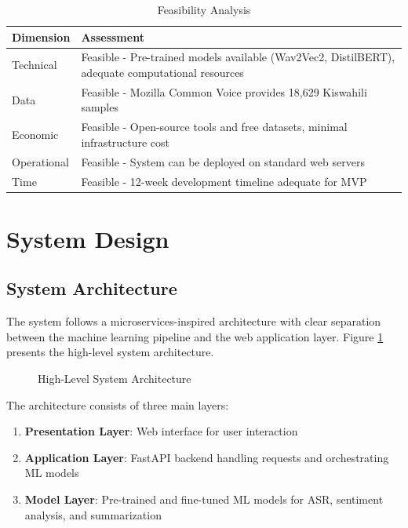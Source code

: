 \documentclass[12pt,a4paper]{report}
\begin{document}
\begin{table}[H]
\centering
\caption{Feasibility Analysis}
\label{tab:feasibility}
\begin{tabular}{@{}lp{10cm}@{}}
\toprule
\textbf{Dimension} & \textbf{Assessment} \\ \midrule
Technical & Feasible - Pre-trained models available (Wav2Vec2, DistilBERT), adequate computational resources \\
Data & Feasible - Mozilla Common Voice provides 18,629 Kiswahili samples \\
Economic & Feasible - Open-source tools and free datasets, minimal infrastructure cost \\
Operational & Feasible - System can be deployed on standard web servers \\
Time & Feasible - 12-week development timeline adequate for MVP \\ \bottomrule
\end{tabular}
\end{table}

\section{System Design}
\subsection{System Architecture}
The system follows a microservices-inspired architecture with clear separation between the machine learning pipeline and the web application layer. Figure \ref{fig:system_architecture} presents the high-level system architecture.

\begin{figure}[H]
    \centering
    
    \caption{High-Level System Architecture}
    \label{fig:system_architecture}
\end{figure}

The architecture consists of three main layers:

\begin{enumerate}
    \item \textbf{Presentation Layer}: Web interface for user interaction
    \item \textbf{Application Layer}: FastAPI backend handling requests and orchestrating ML models
    \item \textbf{Model Layer}: Pre-trained and fine-tuned ML models for ASR, sentiment analysis, and summarization
\end{enumerate}
\end{document}
